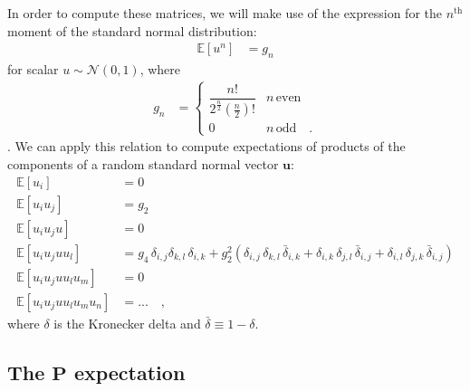 \documentclass[modern]{aastex62}
\begin{document}
    In order to compute these matrices,
    we will make use of the expression for the
    $n^\mathrm{th}$ moment of the standard normal distribution:
    \begin{align}
        \mathbb{E}\left[ u^n \right] & = g_n
    \end{align}
    for scalar $u \sim \mathcal{N}(0, 1)$, where
    \begin{align}
        g_n
         & =
        \begin{cases}
            \dfrac{n!}{2^\frac{n}{2} \left(\frac{n}{2}\right)!} & n \, \mathrm{even}
            \\
            0                                                   & n \, \mathrm{odd}
            \quad.
        \end{cases}
    \end{align}
    \citep[e.g.,][]{Winkelbauer2012}.
    We can apply this relation to compute expectations
    of products of the components of a random standard normal vector $\mathbf{u}$:
    \begin{align}
        \mathbb{E}\left[u_i \right]                  & = 0
        \\[1em]
        \mathbb{E}\left[u_i u_j\right]               & = g_2
        \\[1em]
        \mathbb{E}\left[u_i u_j u\right]             & = 0
        \\[1em]
        \mathbb{E}\left[u_i u_j u u_l\right]         & =
        g_4 \, \delta_{i, j} \delta_{k, l} \, \delta_{i, k}
        +
        g_2^2 \left(
        \delta_{i, j} \, \delta_{k, l} \, \bar{\delta}_{i, k}
        +
        \delta_{i, k} \, \delta_{j, l} \, \bar{\delta}_{i, j}
        +
        \delta_{i, l} \, \delta_{j, k} \, \bar{\delta}_{i, j}
        \right)
        \\[1em]
        \mathbb{E}\left[u_i u_j u u_l u_m\right]     & = 0
        \\[1em]
        \mathbb{E}\left[u_i u_j u u_l u_m u_n\right] & =
        ...
        \quad,
    \end{align}
    where $\delta$ is the Kronecker delta and $\bar{\delta} \equiv 1 - \delta$.

    \subsection{The $\mathbf{P}$ expectation}
\end{document}
